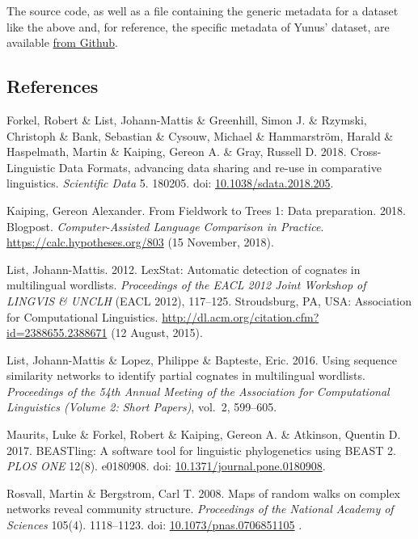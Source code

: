 \documentclass[
  a4paper,
  14pt,
  oneside,
  tablecaptionabove
]{scrbook}
\begin{document}
The source code, as well as a file containing the generic metadata for a
dataset like the above and, for reference, the specific metadata of
Yunus' dataset, are available
\href{https://github.com/Anaphory/matrix_to_beastling}{from Github}. 

\subsection*{References}

\nopagebreak\hangindent=0.7cm {\small Forkel, Robert \& List, Johann-Mattis \& Greenhill, Simon J. \&
Rzymski, Christoph \& Bank, Sebastian \& Cysouw, Michael \& Hammarström,
Harald \& Haspelmath, Martin \& Kaiping, Gereon A. \& Gray, Russell D.
2018. Cross-Linguistic Data Formats, advancing data sharing and re-use
in comparative linguistics. \emph{Scientific Data} 5. 180205. doi:
\href{https://doi.org/10.1038/sdata.2018.205}{10.1038/sdata.2018.205}. 
}

\nopagebreak\hangindent=0.7cm {\small Kaiping, Gereon Alexander. From Fieldwork to Trees 1: Data
preparation. 2018. Blogpost. \emph{Computer-Assisted Language Comparison
in Practice}.  \url{https://calc.hypotheses.org/803} (15 November,
2018). }

\nopagebreak\hangindent=0.7cm {\small List, Johann-Mattis. 2012. LexStat: Automatic detection of cognates in
multilingual wordlists. \emph{Proceedings of the EACL 2012 Joint
Workshop of LINGVIS \& UNCLH} (EACL 2012), 117--125. Stroudsburg, PA,
USA: Association for Computational Linguistics.
\url{http://dl.acm.org/citation.cfm?id=2388655.2388671} (12 August,
2015). }

\nopagebreak\hangindent=0.7cm {\small List, Johann-Mattis \& Lopez, Philippe \& Bapteste, Eric. 2016. Using
sequence similarity networks to identify partial cognates in
multilingual wordlists. \emph{Proceedings of the 54th Annual Meeting of
the Association for Computational Linguistics (Volume 2: Short Papers)},
vol.~2, 599--605. }

\nopagebreak\hangindent=0.7cm {\small Maurits, Luke \& Forkel, Robert \& Kaiping, Gereon A. \& Atkinson,
Quentin D. 2017. BEASTling: A software tool for linguistic phylogenetics
using BEAST 2. \emph{PLOS ONE} 12(8). e0180908. doi:
\href{https://doi.org/10.1371/journal.pone.0180908}{10.1371/journal.pone.0180908}.
}

\nopagebreak\hangindent=0.7cm {\small Rosvall, Martin \& Bergstrom, Carl T. 2008. Maps of random walks on
complex networks reveal community structure. \emph{Proceedings of the
National Academy of Sciences} 105(4). 1118--1123. doi:
\href{https://doi.org/10.1073/pnas.0706851105}{10.1073/pnas.0706851105}
. }
\end{document}
